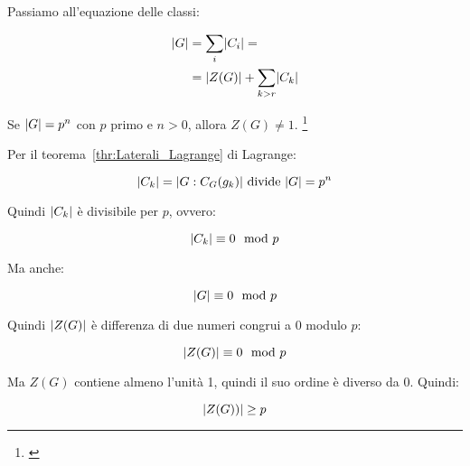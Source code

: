 Passiamo all'equazione delle classi:

\begin{align}
	\lvert G \rvert &= \sum_i \lvert C_i \rvert = \\
	&= \lvert Z(G) \rvert + \sum_{k> r}\lvert C_k \rvert
\end{align}

\begin{teorema}
	Se $\lvert G \rvert = p^n$ con $p$ primo e $n > 0$, allora $Z(G) \ne 1$.
	\footnote{\cite[Teorema 1.11, pag. 76]{jacobson}}
\end{teorema}
\begin{dimostrazione}	
	Per il teorema~\ref{thr:Laterali_Lagrange} di Lagrange:
	
	\begin{equation}
		\lvert C_k \rvert = \lvert G:C_G(g_k) \rvert \text{ divide } \lvert G \rvert = p^n
	\end{equation} 
	
	Quindi $\lvert C_k \rvert$ è divisibile per $p$, ovvero:
	
	\begin{equation}
		\lvert C_k \rvert \equiv 0 \mod p
	\end{equation}
	
	Ma anche:
	
	\begin{equation}
		\lvert G \rvert \equiv 0 \mod p
	\end{equation}
	
	Quindi $\lvert Z(G) \rvert$ è differenza di due numeri congrui a 0 modulo $p$:
	
	\begin{equation}
		\lvert Z(G) \rvert \equiv 0 \mod p
	\end{equation}
	
	Ma $Z(G)$ contiene almeno l'unità 1, quindi il suo ordine è diverso da 0. Quindi:
	
	\begin{equation}
		\lvert Z(G)) \rvert \ge p
	\end{equation}
\end{dimostrazione}
